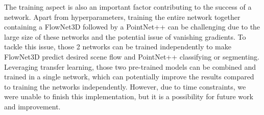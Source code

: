 The training aspect is also an important factor contributing to the success of a network. Apart from hyperparameters, training the entire network together containing a  FlowNet3D followed by a PointNet++ can be challenging due to the large size of these networks and the potential issue of vanishing gradients. To tackle this issue, those 2 networks can be trained independently to make FlowNet3D predict desired scene flow and PointNet++ classifying or segmenting. Leveraging transfer learning, those two pre-trained models can be combined and trained in a single network, which can potentially improve the results compared to training the networks independently.  However, due to time constraints, we were unable to finish this implementation, but it is a possibility for future work and improvement.\\

